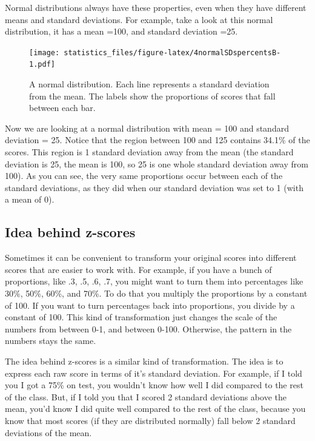 \documentclass[]{book}
\begin{document}
Normal distributions always have these properties, even when they have different means and standard deviations. For example, take a look at this normal distribution, it has a mean =100, and standard deviation =25.

\begin{figure}
\centering
\texttt{[image: statistics\_files/figure-latex/4normalSDspercentsB-1.pdf]}
\caption{\label{fig:4normalSDspercentsB}A normal distribution. Each line represents a standard deviation from the mean. The labels show the proportions of scores that fall between each bar.}
\end{figure}

Now we are looking at a normal distribution with mean = 100 and standard deviation = 25. Notice that the region between 100 and 125 contains 34.1\% of the scores. This region is 1 standard deviation away from the mean (the standard deviation is 25, the mean is 100, so 25 is one whole standard deviation away from 100). As you can see, the very same proportions occur between each of the standard deviations, as they did when our standard deviation was set to 1 (with a mean of 0).

\hypertarget{idea-behind-z-scores}{%
\subsection{Idea behind z-scores}\label{idea-behind-z-scores}}

Sometimes it can be convenient to transform your original scores into different scores that are easier to work with. For example, if you have a bunch of proportions, like .3, .5, .6, .7, you might want to turn them into percentages like 30\%, 50\%, 60\%, and 70\%. To do that you multiply the proportions by a constant of 100. If you want to turn percentages back into proportions, you divide by a constant of 100. This kind of transformation just changes the scale of the numbers from between 0-1, and between 0-100. Otherwise, the pattern in the numbers stays the same.

The idea behind z-scores is a similar kind of transformation. The idea is to express each raw score in terms of it's standard deviation. For example, if I told you I got a 75\% on test, you wouldn't know how well I did compared to the rest of the class. But, if I told you that I scored 2 standard deviations above the mean, you'd know I did quite well compared to the rest of the class, because you know that most scores (if they are distributed normally) fall below 2 standard deviations of the mean.
\end{document}
